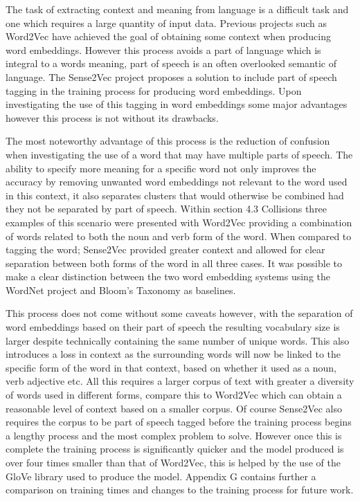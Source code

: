The task of extracting context and meaning from language is a difficult task and one which requires a large quantity of input data. Previous projects such as Word2Vec have achieved the goal of obtaining some context when producing word embeddings. However this process avoids a part of language which is integral to a words meaning, part of speech is an often overlooked semantic of language. The Sense2Vec project proposes a solution to include part of speech tagging in the training process for producing word embeddings. Upon investigating the use of this tagging in word embeddings some major advantages however this process is not without its drawbacks.

The most noteworthy advantage of this process is the reduction of confusion when investigating the use of a word that may have multiple parts of speech. The ability to specify more meaning for a specific word not only improves the accuracy by removing unwanted word embeddings not relevant to the word used in this context, it also separates clusters that would otherwise be combined had they not be separated by part of speech. Within section 4.3 Collisions three examples of this scenario were presented with Word2Vec providing a combination of words related to both the noun and verb form of the word. When compared to tagging the word; Sense2Vec provided greater context and allowed for clear separation between both forms of the word in all three cases. It was possible to make a clear distinction between the two word embedding systems using the WordNet project and Bloom's Taxonomy as baselines.

This process does not come without some caveats however, with the separation of word embeddings based on their part of speech the resulting vocabulary size is larger despite technically containing the same number of unique words. This also introduces a loss in context as the surrounding words will now be linked to the specific form of the word in that context, based on whether it used as a noun, verb adjective etc. All this requires a larger corpus of text with greater a diversity of words used in different forms, compare this to Word2Vec which can obtain a reasonable level of context based on a smaller corpus. Of course Sense2Vec also requires the corpus to be part of speech tagged before the training process begins a lengthy process and the most complex problem to solve. However once this is complete the training process is significantly quicker and the model produced is over four times smaller than that of Word2Vec, this is helped by the use of the GloVe library used to produce the model. Appendix G contains further a comparison on training times and changes to the training process for future work.
